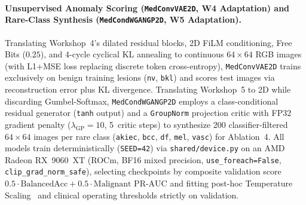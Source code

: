 \paragraph{Unsupervised Anomaly Scoring (\texttt{MedConvVAE2D}, W4 Adaptation) and Rare-Class Synthesis (\texttt{MedCondWGANGP2D}, W5 Adaptation).}
Translating Workshop~4's dilated residual blocks, 2D FiLM conditioning, Free Bits ($0.25$), and 4-cycle cyclical KL annealing to continuous $64\times 64$ RGB images (with L1+MSE loss replacing discrete token cross-entropy), \texttt{MedConvVAE2D} trains exclusively on benign training lesions (\texttt{nv}, \texttt{bkl}) and scores test images via reconstruction error plus KL divergence. Translating Workshop~5 to 2D while discarding Gumbel-Softmax, \texttt{MedCondWGANGP2D} employs a class-conditional residual generator (\texttt{tanh} output) and a \texttt{GroupNorm} projection critic with FP32 gradient penalty ($\lambda_{\mathrm{GP}}=10$, 5~critic steps) to synthesize 200 classifier-filtered $64\times 64$ images per rare class (\texttt{akiec}, \texttt{bcc}, \texttt{df}, \texttt{mel}, \texttt{vasc}) for Ablation~4. All models train deterministically (\texttt{SEED=42}) via \texttt{shared/device.py} on an AMD Radeon RX~9060~XT (ROCm, BF16 mixed precision, \texttt{use\_foreach=False}, \texttt{clip\_grad\_norm\_safe}), selecting checkpoints by composite validation score $0.5 \cdot \text{BalancedAcc} + 0.5 \cdot \text{Malignant PR-AUC}$ and fitting post-hoc Temperature Scaling~\cite{Guo2017calibration} and clinical operating thresholds strictly on validation.
